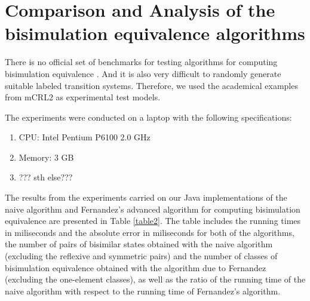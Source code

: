 \section{Comparison and Analysis of the bisimulation equivalence algorithms}

There is no official set of benchmarks for testing algorithms for computing bisimulation equivalence \cite{PiazzaPolicriti}. And it is also very difficult to randomly generate suitable labeled transition systems. Therefore, we used the academical examples from mCRL2 as experimental test models. 

The experiments were conducted on a laptop with the following specifications: 
\begin{enumerate}
	\item CPU: Intel Pentium P6100 2.0 GHz
	\item Memory: 3 GB
	\item ??? sth else???
\end{enumerate}

The results from the experiments carried on our Java implementations of the naive algorithm and Fernandez's advanced algorithm for computing bisimulation equivalence are presented in Table \ref{table2}. The table includes the running times in miliseconds and the absolute error in miliseconds for both of the algorithms, the number of pairs of bisimilar states obtained with the naive algorithm (excluding the reflexive and symmetric pairs) and the number of classes of bisimulation equivalence obtained with the algorithm due to Fernandez (excluding the one-element classes), as well as the ratio of the running time of the naive algorithm with respect to the running time of Fernandez's algorithm.

